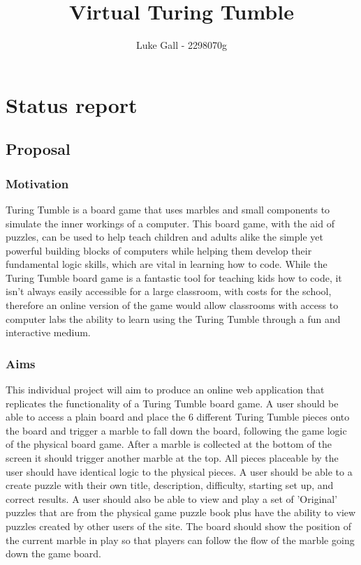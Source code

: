 \documentclass[11pt]{article}
\title{Virtual Turing Tumble}
\author{ Luke Gall - 2298070g }
\begin{document}
\maketitle



\section{Status report}

\subsection{Proposal}\label{proposal}

\subsubsection{Motivation}\label{motivation}

Turing Tumble is a board game that uses marbles and small components to simulate the inner workings of a computer. This board game, with the aid of puzzles, can be used to help teach children and adults alike the simple yet powerful building blocks of computers while helping them develop their fundamental logic skills, which are vital in learning how to code. While the Turing Tumble board game is a fantastic tool for teaching kids how to code, it isn't always easily accessible for a large classroom, with costs for the school, therefore an online version of the game would allow classrooms with access to computer labs the ability to learn using the Turing Tumble through a fun and interactive medium.

\subsubsection{Aims}\label{aims}

This individual project will aim to produce an online web application that replicates the functionality of a Turing Tumble board game. A user should be able to access a plain board and place the 6 different Turing Tumble pieces onto the board and trigger a marble to fall down the board, following the game logic of the physical board game. After a marble is collected at the bottom of the screen it should trigger another marble at the top. All pieces placeable by the user should have identical logic to the physical pieces. A user should be able to a create puzzle with their own title, description, difficulty, starting set up, and correct results. A user should also be able to view and play a set of 'Original' puzzles that are from the physical game puzzle book plus have the ability to view puzzles created by other users of the site. The board should show the position of the current marble in play so that players can follow the flow of the marble going down the game board.
\end{document}
